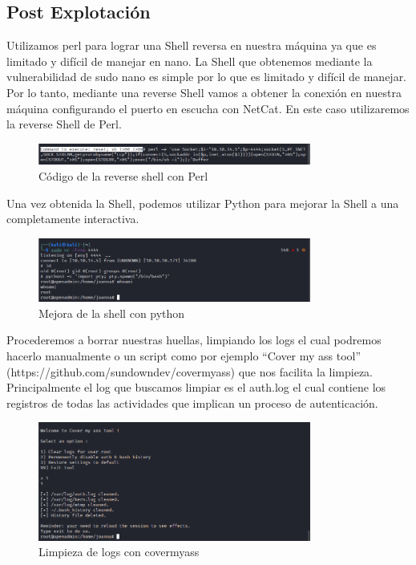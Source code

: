 \documentclass{article}
\begin{document}
\subsection{Post Explotación}

Utilizamos perl para lograr una Shell reversa en nuestra máquina ya que es limitado y difícil de manejar en nano.
La Shell que obtenemos mediante la vulnerabilidad de sudo nano es simple por lo que es limitado y difícil de manejar. Por lo tanto, mediante una reverse Shell vamos a obtener la conexión en nuestra máquina configurando el puerto en escucha con NetCat. En este caso utilizaremos la reverse Shell de Perl.
\begin{figure}[H]
	\center
	\includegraphics[width=0.8\textwidth]{images/openadmin/21-reverseshellperl.png}
	\caption{Código de la reverse shell con Perl}
\end{figure}

Una vez obtenida la Shell, podemos utilizar Python para mejorar la Shell a una completamente interactiva.
\begin{figure}[H]
	\center
	\includegraphics[width=0.8\textwidth]{images/openadmin/22-conexionreverse}
	\caption{Mejora de la shell con python}
\end{figure}

Procederemos a borrar nuestras huellas, limpiando los logs el cual podremos hacerlo manualmente o un script como por ejemplo “Cover my ass tool” (https://github.com/sundowndev/covermyass) que nos facilita la limpieza. Principalmente el log que buscamos limpiar es el auth.log el cual contiene los registros de todas las actividades que implican un proceso de autenticación.
\begin{figure}[H]
	\center
	\includegraphics[width=0.8\textwidth]{images/openadmin/23-covermyass}
	\caption{Limpieza de logs con covermyass}
\end{figure}
\end{document}
